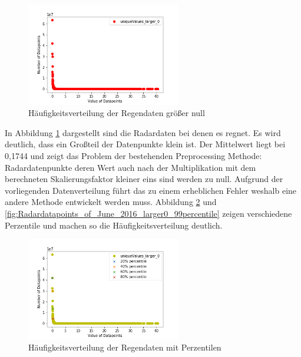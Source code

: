 \begin{figure}[H]
    \centering
    \includegraphics[width=0.6\textwidth,angle=0]{abb/Radardatapoints_of_June_2016_larger0}
    \caption[Datenaufbereitung]{Häufigkeitsverteilung der Regendaten größer null}
    \label{fig:Radardatapoints_of_June_2016_larger0}
\end{figure}

In Abbildung \ref{fig:Radardatapoints_of_June_2016_larger0} dargestellt sind die Radardaten bei denen es regnet. Es wird deutlich, dass ein Großteil der Datenpunkte klein ist. Der Mittelwert liegt bei 0,1744 und zeigt das Problem der bestehenden Preprocessing Methode: Radardatenpunkte deren Wert auch nach der Multiplikation mit dem berechneten Skalierungsfaktor kleiner eins sind werden zu null. Aufgrund der vorliegenden Datenverteilung führt das zu einem erheblichen Fehler weshalb eine andere Methode entwickelt werden muss.
Abbildung \ref{fig:Radardatapoints_of_June_2016_larger0_percentiles} und \ref{fig:Radardatapoints_of_June_2016_larger0_99percentile} zeigen verschiedene Perzentile und machen so die Häufigkeitsverteilung deutlich.

\begin{figure}[H]
    \centering
    \includegraphics[width=0.6\textwidth,angle=0]{abb/Radardatapoints_of_June_2016_larger0_percentiles.png}
    \caption[Datenaufbereitung]{Häufigkeitsverteilung der Regendaten mit Perzentilen}
    \label{fig:Radardatapoints_of_June_2016_larger0_percentiles}
\end{figure}

